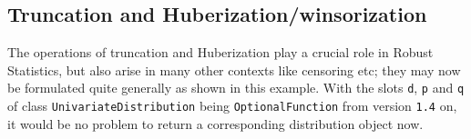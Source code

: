 \documentclass[11pt]{article}
\begin{document}
\subsection{Truncation and Huberization/winsorization}\label{truncex}
\begin{small}
The operations of truncation and Huberization play a crucial role in Robust 
Statistics, but also arise in many other contexts like censoring etc; they may 
now be formulated quite generally as shown in this example. With the slots
 {\tt d}, {\tt p} and {\tt q} of class {\tt UnivariateDistribution} being
{\tt OptionalFunction} from version {\tt 1.4} on, it would be no problem to 
return a corresponding distribution object now.
\end{small}
\end{document}
